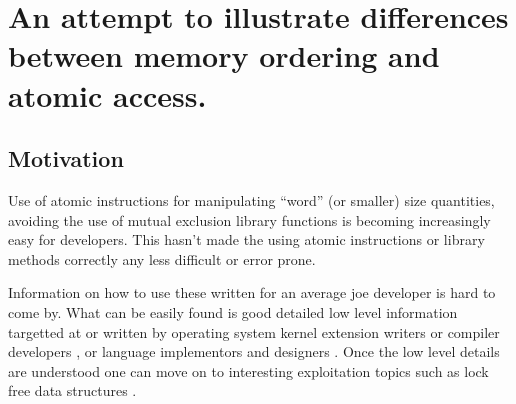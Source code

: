 

\usepackage{listings}


\chapter{An attempt to illustrate differences between memory ordering and atomic access.}
\label{chap:atomic}
{}
\date{Oct 8, 2009}

\beginArtWithToc

\section{Motivation}

Use of atomic instructions for manipulating ``word'' (or smaller) size quantities, avoiding the use of mutual exclusion library functions is becoming increasingly easy for developers.  This hasn't made the using atomic instructions or library methods correctly any less difficult or error prone.

Information on how to use these written for an average joe developer is hard to come by.  What can be easily found is good detailed low level information targetted at or written by operating system kernel extension writers or compiler developers \cite{lyons2002powerpc}, or language implementors and designers \cite{lea2005jsr} \cite{boehmMM} \cite{manson2004jsr} \cite{boehm2007c++} \cite{sutter2006prism} \cite{blainey2007weakmm} \cite{adve1996shared}.  Once the low level details are understood one can move on to interesting exploitation topics such as lock free data structures \cite{harris2002practical} \cite{harris2001pragmatic} \cite{harrisPapers} \cite{benciaWeb} \cite{michael2002safe} \cite{valois-lock}.

